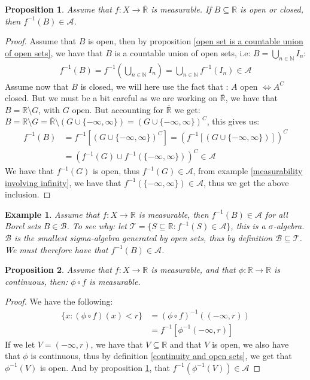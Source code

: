 \documentclass{article}
\newcommand{\R}{\mathbb{R}}
\newcommand{\N}{\mathbb{N}}
\newcommand{\A}{\mathcal{A}}
\newcommand{\Rbar}{\overline{\mathbb{R}}}%
\newcommand{\B}{\mathcal{B}}
\newtheorem{prop}{Proposition}
\newtheorem{ex}{Example}
\newtheorem{proof}{Proof}
\begin{document}
\begin{prop}
\label{prop: B closed or open, inverse image in A}
Assume that $f:X\to \Rbar$ is measurable. If $B\subseteq \R$ is open or closed, then $f^{-1}(B) \in \A$. 
\end{prop}

\begin{proof}
Assume that $B$ is open, then by proposition \ref{open set is a countable union of open sets}, we have that $B$ is a countable union of open sets, i.e: $B = \bigcup_{n\in \N}I_{n}$: 
\begin{align*}
f^{-1}(B) = f^{-1}(\bigcup_{n\in\N}I_{n}) = \bigcup_{n\in \N}f^{-1}(I_{n})\in \A
\end{align*}
Assume now that $B$ is closed, we will here use the fact that : $A$ open $\iff A^{C}$ closed. But we must be a bit careful as we are working on $\Rbar$, we have that $B = \R \setminus G$, with $G$ open. But accounting for $\Rbar$ we get: $B = \R\setminus G = \Rbar \setminus (G\cup \{-\infty, \infty\}) = (G\cup \{-\infty, \infty\})^{C}$, this gives us: 
\begin{align*}
f^{-1}(B) &= f^{-1}[(G\cup \{-\infty, \infty\})^{C}] =  \left(f^{-1}[(G\cup \{-\infty, \infty\})] \right)^{C} \\
&= 
\left(f^{-1}(G)\cup f^{-1}(\{-\infty, \infty\})\right)^{C} \in \A
\end{align*}
We have that $f^{-1}(G)$ is open, thus $f^{-1}(G)\in \A$, from example \ref{measurability involving infinity}, we have that $f^{-1}(\{-\infty, \infty\}) \in \A$, thus we get the above inclusion.
\end{proof} 

\begin{ex}
Assume that $f:X\to \R$ is measurable, then $f^{-1}(B)\in \A$ for all Borel sets $B\in \B$. To see why: let $\mathcal{T} = \{S\subseteq \R: f^{-1}(S) \in \A\}$, this is a $\sigma$-algebra. $\B$ is the smallest sigma-algebra generated by open sets, thus by definition $\B\subseteq \mathcal{T}$. We must therefore have that $f^{-1}(B)\in \A$. 
\end{ex}

\begin{prop}
\label{prop: composition is measurable}
Assume that $f:X\to \R$ is measurable, and that $\phi:\R\to\R$ is continuous, then: $\phi \circ f$ is measurable.
\end{prop}

\begin{proof}
We have the following: 
\begin{align*}
\{x: (\phi \circ f)(x) < r\} &= (\phi \circ f)^{-1}((-\infty,r))\\ 
&= f^{-1}[\phi^{-1}(-\infty,r)]
\end{align*}
If we let $V = (-\infty, r)$, we have that $V\subseteq \R$ and that $V$ is open, we also have that $\phi$ is continuous, thus by definition \ref{continuity and open sets}, we get that $\phi^{-1}(V)$ is open. And by proposition \ref{prop: B closed or open, inverse image in A}, that $f^{-1}(\phi^{-1}(V)) \in \A$
\end{proof}
\end{document}
